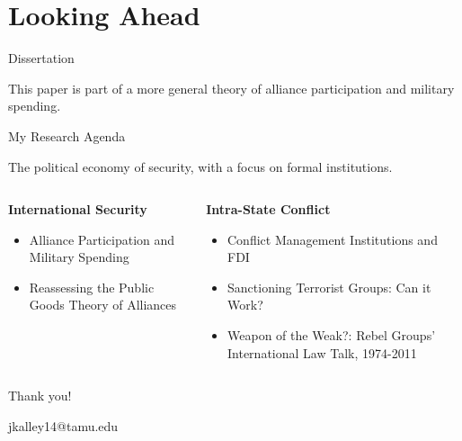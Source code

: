 \documentclass{beamer}
\begin{document}

\section{Looking Ahead}


\begin{frame}{Dissertation}

This paper is part of a more general theory of alliance participation and military spending. 

\end{frame}




\begin{frame}{My Research Agenda}

The political economy of security, with a focus on formal institutions. 

\begin{columns}

\begin{column}{0.5\textwidth}
\textbf{International Security}
\begin{itemize} 
\item Alliance Participation and Military Spending 
\item Reassessing the Public Goods Theory of Alliances
\end{itemize} 
\end{column}



\begin{column}{0.5\textwidth}
\textbf{Intra-State Conflict}
\begin{itemize}
\item Conflict Management Institutions and FDI
\item Sanctioning Terrorist Groups: Can it Work?
\item Weapon of the Weak?: Rebel Groups' International Law Talk, 1974-2011
\end{itemize} 
\end{column}

\end{columns}
 

\end{frame}



 \begin{frame}[standout]

Thank you! 

jkalley14@tamu.edu

 \end{frame}
\end{document}
